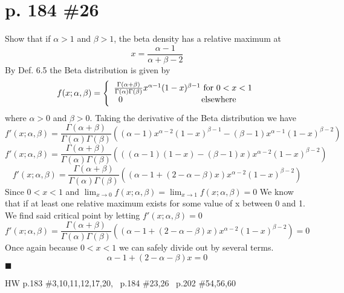 \documentclass[12pt]{article}
\begin{document}
	\section[20pt]{p. 184 \#26}
	Show that if \(\alpha>1\) and \(\beta>1\), the beta density has a relative maximum at
	\[x=\frac{\alpha-1}{\alpha+\beta-2}\]
	\newline
	By Def. 6.5 the Beta distribution is given by
	\[f(x;\alpha,\beta)=\left\{\begin{array}{ccc}
	\frac{\Gamma(\alpha+\beta)}{\Gamma(\alpha)\Gamma(\beta)}x^{\alpha-1}(1-x)^{\beta-1} \textup{ for }0<x<1\\0 \ \ \ \ \ \ \ \ \ \ \ \ \ \ \ \ \ \ \ \ \ \ \ \ \ \ \ \ \textup{elsewhere} \ \ \ \ 
	\end{array}\right.\]
	where \(\alpha>0\) and \(\beta>0\).
	\newline \newline
	Taking the derivative of the Beta distribution we have
	\[f'(x;\alpha,\beta)=\frac{\Gamma(\alpha+\beta)}{\Gamma(\alpha)\Gamma(\beta)}\left((\alpha-1)x^{\alpha-2}(1-x)^{\beta-1}-(\beta-1)x^{\alpha-1}(1-x)^{\beta-2}\right)\]
	\[f'(x;\alpha,\beta)=\frac{\Gamma(\alpha+\beta)}{\Gamma(\alpha)\Gamma(\beta)}\left(((\alpha-1)(1-x)-(\beta-1)x)x^{\alpha-2}(1-x)^{\beta-2}\right)\]
	\[f'(x;\alpha,\beta)=\frac{\Gamma(\alpha+\beta)}{\Gamma(\alpha)\Gamma(\beta)}\left((\alpha-1+(2-\alpha-\beta)x)x^{\alpha-2}(1-x)^{\beta-2}\right)\]
	Since \(0<x<1\) and \( \lim_{x\rightarrow 0}f(x;\alpha,\beta)=\lim_{x\rightarrow 1}f(x;\alpha,\beta)=0\) We know that if at least one relative maximum exists for some value of x between 0 and 1. \newline \newline
	We find said critical point by letting \(f'(x;\alpha,\beta)=0\)
	\[f'(x;\alpha,\beta)=\frac{\Gamma(\alpha+\beta)}{\Gamma(\alpha)\Gamma(\beta)}\left((\alpha-1+(2-\alpha-\beta)x)x^{\alpha-2}(1-x)^{\beta-2}\right)=0\]
	Once again because \(0<x<1\) we can safely divide out by several terms.
	\[\alpha-1+(2-\alpha-\beta)x=0\]
	 \newline \newline
	\(\blacksquare\)
	\newpage
	\maketitle HW p.183 \#3,10,11,12,17,20, \ p.184 \#23,26 \ p.202 \#54,56,60
\end{document}
